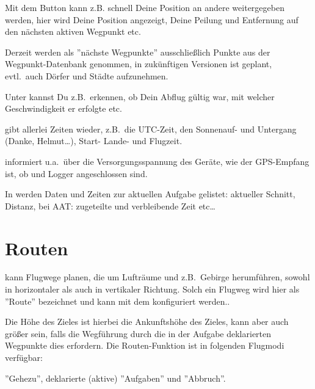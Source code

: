 
Mit dem Button  kann z.B. schnell Deine Position an andere 
weitergegeben werden, hier wird Deine Position angezeigt, Deine Peilung und Entfernung auf den nächsten aktiven Wegpunkt etc. 


Derzeit werden als ''nächste Wegpunkte'' ausschließlich Punkte aus der Wegpunkt-Datenbank genommen, in zukünftigen Versionen ist geplant, evtl.\  auch Dörfer und Städte aufzunehmen.%

Unter kannst Du z.B.\ erkennen, ob Dein Abflug gültig war, mit welcher Geschwindigkeit er erfolgte etc.\ 

gibt allerlei Zeiten wieder, z.B.\ die UTC-Zeit, den Sonnenauf- und Untergang (Danke, Helmut\dots), Start- Lande- und Flugzeit. 

informiert u.a.\ über die Versorgungsspannung des Geräte, wie der GPS-Empfang ist, ob \fl und Logger angeschlossen sind. 

In werden Daten und Zeiten zur aktuellen Aufgabe gelistet: aktueller Schnitt, Distanz, bei AAT: zugeteilte und verbleibende Zeit etc\dots 


\section{Routen}\label{sec:route}

\xc kann Flugwege planen, die um Lufträume und z.B.\ Gebirge herumführen, sowohl in 
horizontaler als auch in vertikaler Richtung. Solch ein Flugweg wird hier als ''Route'' bezeichnet und kann mit dem  konfiguriert werden..

Die Höhe des Zieles ist hierbei die Ankunftshöhe des Zieles, kann aber auch größer sein, falls die Wegführung durch die in der Aufgabe deklarierten Wegpunkte dies erfordern. Die Routen-Funktion ist in folgenden Flugmodi verfügbar:

''Gehezu'', deklarierte (aktive) ''Aufgaben'' und ''Abbruch''.

